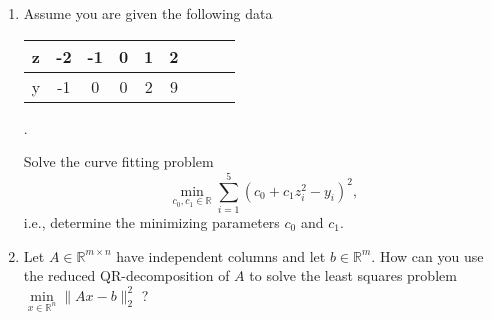 \begin{enumerate}
	\item Assume you are given the following data
	\begin{center}
		\begin{tabular}{|l|c|c|c|c|c|c||c|c|}\hline
			z&-2&-1&0&1&2\\ 
			\hline
			y&-1&0&0&2&9\\
			\hline
		\end{tabular}.
	\end{center}
	Solve the curve fitting problem
	$$
	\min\limits_{c_0, c_1 \in \mathbb{R}} \sum_{i=1}^5 (c_0 + c_1z_i^2 - y_i)^2,
	$$
	i.e., determine the minimizing parameters $c_0$ and $c_1$.
	\item Let  $A \in \mathbb{R}^{m \times n}$ have independent columns and let $b \in \mathbb{R}^{m}$. How can you use the reduced QR-decomposition of $A$ to solve the least squares problem $
\min\limits_{x \in \mathbb{R}^n } \| Ax - b \|_2^2
$ ?
\end{enumerate}

 